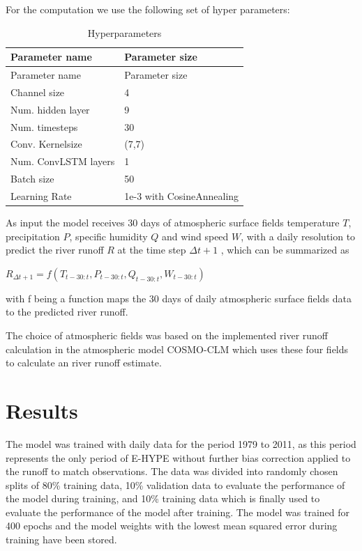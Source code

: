 \documentclass[
]{agujournal2019}
\begin{document}
For the computation we use the following set of hyper parameters:

\begin{longtable}[]{@{}ll@{}}
\caption{Hyperparameters}\label{tbl-letters}\tabularnewline
\toprule\noalign{}
Parameter name & Parameter size \\
\midrule\noalign{}
\endfirsthead
\toprule\noalign{}
Parameter name & Parameter size \\
\midrule\noalign{}
\endhead
\bottomrule\noalign{}
\endlastfoot
Channel size & 4 \\
Num. hidden layer & 9 \\
Num. timesteps & 30 \\
Conv. Kernelsize & (7,7) \\
Num. ConvLSTM layers & 1 \\
Batch size & 50 \\
Learning Rate & 1e-3 with CosineAnnealing \\
\end{longtable}

As input the model receives 30 days of atmospheric surface fields
temperature \(T\), precipitation \(P\), specific humidity \(Q\) and wind
speed \(W\), with a daily resolution to predict the river runoff \(R\)
at the time step \(\Delta t+1\) , which can be summarized as

\(R_{\Delta t+1} = f\left(T_{t-30:t}, P_{t-30:t}, Q_{t-30:t}, W_{t-30:t}\right)\)

with f being a function maps the 30 days of daily atmospheric surface
fields data to the predicted river runoff.

The choice of atmospheric fields was based on the implemented river
runoff calculation in the atmospheric model COSMO-CLM which uses these
four fields to calculate an river runoff estimate.

\section{Results}\label{results}

The model was trained with daily data for the period 1979 to 2011, as
this period represents the only period of E-HYPE without further bias
correction applied to the runoff to match observations. The data was
divided into randomly chosen splits of 80\% training data, 10\%
validation data to evaluate the performance of the model during
training, and 10\% training data which is finally used to evaluate the
performance of the model after training. The model was trained for 400
epochs and the model weights with the lowest mean squared error during
training have been stored.
\end{document}
